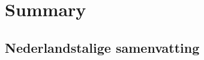 \documentclass[draft,twoside]{book}
\begin{document}
\frontmatter





\tableofcontents

\mainmatter




\backmatter

\chapter{Summary}


\begin{otherlanguage}{dutch}
\chapter{Nederlandstalige samenvatting}

\end{otherlanguage}




\listoffigures
\listoftables

\clearpage
{}
\printindex
\end{document}
